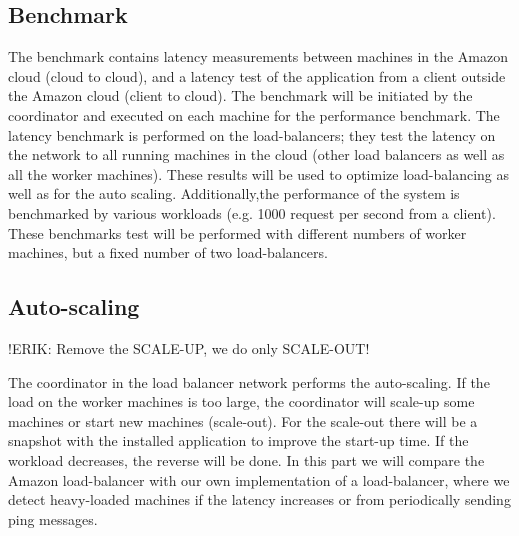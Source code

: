 \documentclass[paper=a4, fontsize=11pt]{scrartcl} %
\numberwithin{equation}{section} %
\numberwithin{figure}{section} %
\numberwithin{table}{section} %
\begin{document}
\subsection{Benchmark}

The benchmark contains latency measurements between machines in the Amazon cloud (cloud to cloud), and a latency test of the application from a client outside the Amazon cloud (client to cloud). The benchmark will be initiated by the coordinator and executed on each machine for the performance benchmark. The latency benchmark is performed on the load-balancers; they test the latency on the network to all running machines in the cloud (other load balancers as well as all the worker machines). These results will be used to optimize load-balancing as well as for the auto scaling.
Additionally,the performance of the system is benchmarked by various workloads (e.g. 1000 request per second from a client). These benchmarks test will be performed with different numbers of worker machines, but a fixed number of two load-balancers.

\subsection{Auto-scaling}
!ERIK: Remove the SCALE-UP, we do only SCALE-OUT!

The coordinator in the load balancer network performs the auto-scaling. If the load on the worker machines is too large, the coordinator will scale-up some machines or start new machines (scale-out). For the scale-out there will be a snapshot with the installed application to improve the start-up time. 
If the workload decreases, the reverse will be done.
In this part we will compare the Amazon load-balancer with our own implementation of a load-balancer, where we detect heavy-loaded machines if the latency increases or from periodically sending ping messages.
\end{document}

